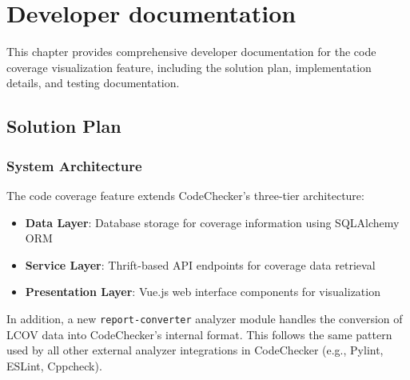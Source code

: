 \chapter{Developer documentation}
\label{ch:impl}

This chapter provides comprehensive developer documentation for the code coverage visualization feature, including the solution plan, implementation details, and testing documentation.

\section{Solution Plan}

\subsection{System Architecture}

The code coverage feature extends CodeChecker's three-tier architecture:

\begin{itemize}
    \item \textbf{Data Layer}: Database storage for coverage information using SQLAlchemy ORM
    \item \textbf{Service Layer}: Thrift-based API endpoints for coverage data retrieval
    \item \textbf{Presentation Layer}: Vue.js web interface components for visualization
\end{itemize}

In addition, a new \texttt{report-converter} analyzer module handles the conversion of LCOV data into CodeChecker's internal format. This follows the same pattern used by all other external analyzer integrations in CodeChecker (e.g., Pylint, ESLint, Cppcheck).


